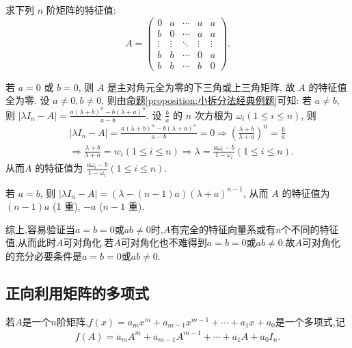 \documentclass[../../main.tex]{subfiles}
\begin{document}
\begin{example}
求下列 $n$ 阶矩阵的特征值:
\[
A = \begin{pmatrix}
0 & a & \cdots & a & a \\
b & 0 & \cdots & a & a \\
\vdots & \vdots & \ddots & \vdots & \vdots \\
b & b & \cdots & 0 & a \\
b & b & \cdots & b & 0
\end{pmatrix}.
\]
\end{example}
\begin{solution}
若 $a = 0$ 或 $b = 0$, 则 $A$ 是主对角元全为零的下三角或上三角矩阵, 故 $A$ 的特征值全为零. 设 $a \neq 0, b \neq 0$, 则由\hyperref[proposition:小拆分法经典例题]{命题\ref{proposition:小拆分法经典例题}}可知:
若 $a \neq b$, 则 $|\lambda I_n-A|=\frac{a(\lambda +b)^n-b(\lambda +a)^n}{a-b}$. 设 $\frac{b}{a}$ 的 $n$ 次方根为 $\omega_i (1 \leqslant  i \leqslant  n)$, 则
\begin{align*}
&|\lambda I_n-A|=\frac{a(\lambda +b)^n-b(\lambda +a)^n}{a-b}=0\Rightarrow \left( \frac{\lambda +b}{\lambda +a} \right) ^n=\frac{b}{a}
\\
&\Rightarrow \frac{\lambda +b}{\lambda +a}=w_i\left( 1\le i\le n \right) \Rightarrow \lambda =\frac{a\omega _i-b}{1-\omega _i}(1\le i\le n).
\end{align*}
从而$A$ 的特征值为 $\frac{a \omega_i - b}{1 - \omega_i} (1 \leqslant  i \leqslant  n)$.

若 $a = b$, 则 $|\lambda I_n - A| = (\lambda - (n - 1)a)(\lambda + a)^{n-1}$, 从而 $A$ 的特征值为 $(n - 1)a$ (1 重), $-a$ ($n - 1$ 重).

综上,容易验证当$a=b=0$或$ab\ne0$时,$A$有完全的特征向量系或有$n$个不同的特征值,从而此时$A$可对角化.若$A$可对角化也不难得到$a=b=0$或$ab\ne0$.故$A$可对角化的充分必要条件是$a=b=0$或$ab\ne0$.
\end{solution}

\subsection{正向利用矩阵的多项式}

\begin{definition}[矩阵多项式]
若$A$是一个$n$阶矩阵,$f(x) = a_m x^m + a_{m-1} x^{m-1} + \cdots + a_1 x + a_0$是一个多项式,记
\begin{align*}
f(A) = a_m A^m + a_{m-1} A^{m-1} + \cdots + a_1 A + a_0 I_n.
\end{align*}
\end{definition}
\end{document}

